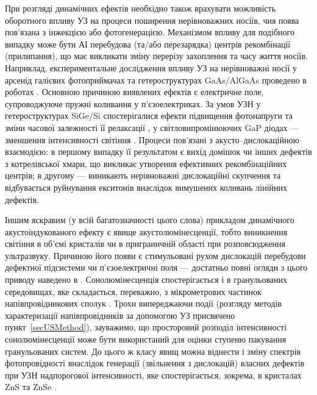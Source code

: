 При розгляді динамічних ефектів необхідно також врахувати можливість оборотного впливу УЗ на процеси поширення нерівноважних носіїв, чия поява пов'язана з інжекцією або фотогенерацією.
Механізмом впливу для подібного випадку може  бути АІ перебудова (та/або перезарядка)  центрів рекомбінації (прилипання), що має викликати зміну перерізу захоплення та часу життя носіїв.
Наприклад, експериментальне дослідження впливу УЗ на нерівноважні носії у арсенід галієвих фотоприймачах та гетероструктурах GaAs/AlGaAs проведено в роботах \cite{Zaveryukhin2002:2,Olikh:Visn2007}.
Основною причиною виявлених ефектів є електричне поле, супроводжуюче пружні коливання у п'єзоелектриках.
За умов УЗН у гетероструктурах SiGe/Si спостерігалися ефекти підвищення фотонапруги та зміни часової залежності її релаксації  \cite{Ostrovskii2001,Kuryliuk2009},
у світловипромінюючих GaP  діодах  --- зменшення інтенсивності світіння \cite{USL:GaP}.
Процеси пов'язані з акусто--дислокаційною взаємодією:
в першому випадку її результатом є вихід домішок чи інших дефектів з котрелівської хмари, що викликає утворення ефективних рекомбінаційних центрів;
в другому --- виникають нерівноважні дислокаційні скупчення та відбувається руйнування екситонів внаслідок вимушених коливань лінійних дефектів.

Іншим яскравим (у всій багатозначності цього слова) прикладом
динамічного акустоіндукованого ефекту
є явище акустолюмінесценції, тобто виникнення світіння в об'ємі  кристалів чи в приграничній області при розповсюдження ультразвуку.
Причиною його появи є стимульовані рухом дислокацій перебудови дефектної підсистеми чи п'єзоелектричні поля ---
достатньо повні огляди з цього приводу наведено в \cite{OstrBook,OSTROVSKII1999}.
Сонолюмінесценція спостерігається і в гранульованих середовищах, яке складається, переважно, з мікрометрових частинок напівпровідникових сполук \cite{KorotRep}.
Трохи випереджаючи події (розгляду методів характеризації напівпровідників за допомогою УЗ присвячено пункт~\ref{secUSMethod}),
зауважимо, що просторовий розподіл інтенсивності сонолюмінесценції може бути використаний для оцінки ступеню пакування гранульованих систем\cite{KorotZnSdens}.
До цього ж класу явищ можна віднести і зміну спектрів фотопровідності внаслідок генерації (звільнення з дислокацій) власних дефектів при УЗН надпорогової інтенсивності, яке спостерігається, зокрема, в кристалах ZnS та ZnSe \cite{OSTROVSKII1992,OSTROVSKII1999}.

